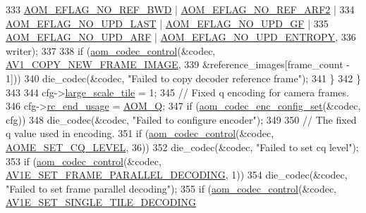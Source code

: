 \begin{DoxyCodeInclude}
{{{{{{{333                        \hyperlink{group__aom__encoder_ga758649aa6cd9fefb15ad888489884a38}{AOM\_EFLAG\_NO\_REF\_BWD} | 
      \hyperlink{group__aom__encoder_gad04799a74215e1b9609f7ccd1766f8c9}{AOM\_EFLAG\_NO\_REF\_ARF2} |
334                        \hyperlink{group__aom__encoder_ga7a55a46970c074b761319c5c46d87b6e}{AOM\_EFLAG\_NO\_UPD\_LAST} | 
      \hyperlink{group__aom__encoder_gaa81cc31f95fd463f51a158050d267a36}{AOM\_EFLAG\_NO\_UPD\_GF} |
335                        \hyperlink{group__aom__encoder_ga469b4cf5ff76cb30de951e129c25a786}{AOM\_EFLAG\_NO\_UPD\_ARF} | 
      \hyperlink{group__aom__encoder_gac5a69f04b0bc88f755587a1da815d754}{AOM\_EFLAG\_NO\_UPD\_ENTROPY},
336                    writer);
337 
338       \textcolor{keywordflow}{if} (\hyperlink{group__codec_ga6da974f4eeaba1fa74106b28d0fe6ac5}{aom\_codec\_control}(&codec, \hyperlink{group__aom_gga9421a1fa78c0d9587ae5aa6c1cb3d659ae41763622ee33cd99e23ca8f78a3f8fa}{AV1\_COPY\_NEW\_FRAME\_IMAGE},
339                             &reference\_images[frame\_count - 1]))
340         die\_codec(&codec, \textcolor{stringliteral}{"Failed to copy decoder reference frame"});
341     \}
342   \}
343 
344   cfg->\hyperlink{structaom__codec__enc__cfg_af4583da6c145778f822a4a61db28c40a}{large\_scale\_tile} = 1;
345   \textcolor{comment}{// Fixed q encoding for camera frames.}
346   cfg->\hyperlink{structaom__codec__enc__cfg_a3fd74d888658039d09bc4eacf163a495}{rc\_end\_usage} = \hyperlink{group__encoder_gga7c084d3ecef569aad166ce70b0e8a957aff3bbd4fe870b4b946c2093e59eb14e5}{AOM\_Q};
347   \textcolor{keywordflow}{if} (\hyperlink{group__encoder_gaf4a4c3c3c91dd92c960990f6e534271d}{aom\_codec\_enc\_config\_set}(&codec, cfg))
348     die\_codec(&codec, \textcolor{stringliteral}{"Failed to configure encoder"});
349 
350   \textcolor{comment}{// The fixed q value used in encoding.}
351   \textcolor{keywordflow}{if} (\hyperlink{group__codec_ga6da974f4eeaba1fa74106b28d0fe6ac5}{aom\_codec\_control}(&codec, \hyperlink{group__aom__encoder_ggae78dde67a6d78f332e9bdba0dde42db5af67f265bf63bf8f1268b3a14ae26606c}{AOME\_SET\_CQ\_LEVEL}, 36))
352     die\_codec(&codec, \textcolor{stringliteral}{"Failed to set cq level"});
353   \textcolor{keywordflow}{if} (\hyperlink{group__codec_ga6da974f4eeaba1fa74106b28d0fe6ac5}{aom\_codec\_control}(&codec, 
      \hyperlink{group__aom__encoder_ggae78dde67a6d78f332e9bdba0dde42db5a465382b6bbca24467739c3c1b94e6483}{AV1E\_SET\_FRAME\_PARALLEL\_DECODING}, 1))
354     die\_codec(&codec, \textcolor{stringliteral}{"Failed to set frame parallel decoding"});
355   \textcolor{keywordflow}{if} (\hyperlink{group__codec_ga6da974f4eeaba1fa74106b28d0fe6ac5}{aom\_codec\_control}(&codec, \hyperlink{group__aom__encoder_ggae78dde67a6d78f332e9bdba0dde42db5af341538631ffe2ac2b562c8b5336a10a}{AV1E\_SET\_SINGLE\_TILE\_DECODING}
}}}}}}}
\end{DoxyCodeInclude}
